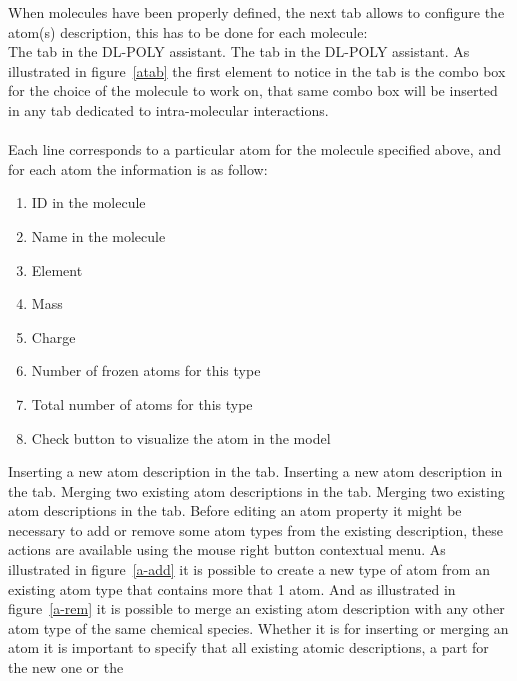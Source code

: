 When molecules have been properly defined, the next tab allows to configure the atom(s) description, this has to be done for each molecule: \\ 
{The  tab in the DL-POLY assistant.}
{The  tab in the DL-POLY assistant.}
\laf As illustrated in figure~\ref{atab} the first element to notice in the  tab is the combo box for the choice of the molecule to work on, 
that same combo box will be inserted in any tab dedicated to intra-molecular interactions. \\
\\Each line corresponds to a particular atom for the molecule specified above, and for each atom the information is as follow: 
\begin{enumerate}
\item ID in the molecule
\item Name in the molecule
\item Element
\item Mass
\item Charge
\item Number of frozen atoms for this type
\item Total number of atoms for this type
\item Check button to visualize the atom in the model
\end{enumerate}
\clearpage 
{}
{Inserting a new atom description in the  tab.}
{Inserting a new atom description in the  tab.}
{Merging two existing atom descriptions in the  tab.}
{Merging two existing atom descriptions in the  tab.}
\clearpage
\noindent Before editing an atom property it might be necessary to add or remove some atom types from the existing description, 
these actions are available using the mouse right button contextual menu. 
As illustrated in figure~\ref{a-add} it is possible to create a new type of atom from an existing atom type that contains more that 1 atom. 
And as illustrated in figure~\ref{a-rem} it is possible to merge an existing atom description with any other atom type of the same chemical species. 
Whether it is for inserting or merging an atom it is important to specify that all existing atomic descriptions, a part for the new one or the 
